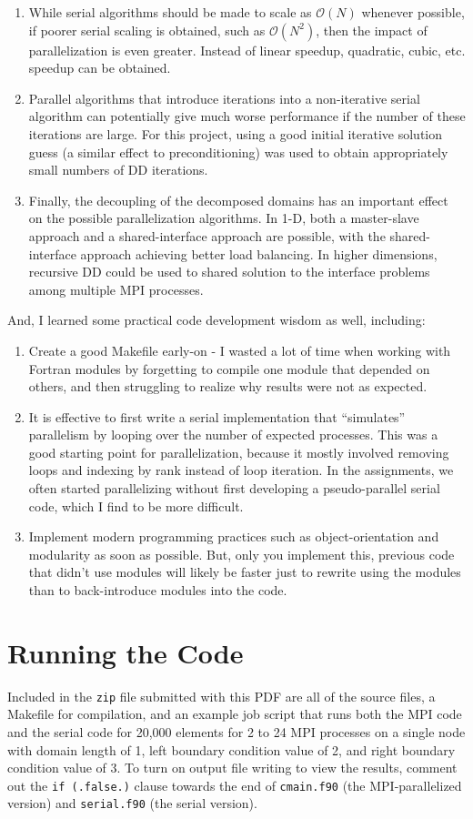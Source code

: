 \documentclass[10pt]{article}
\begin{document}
\begin{enumerate}
\item While serial algorithms should be made to scale as \(\mathscr{O}(N)\) whenever possible, if poorer serial scaling is obtained, such as \(\mathscr{O}(N^2)\), then the impact of parallelization is even greater. Instead of linear speedup, quadratic, cubic, etc. speedup can be obtained. 
\item Parallel algorithms that introduce iterations into a non-iterative serial algorithm can potentially give much worse performance if the number of these iterations are large. For this project, using a good initial iterative solution guess (a similar effect to preconditioning) was used to obtain appropriately small numbers of DD iterations.
\item Finally, the decoupling of the decomposed domains has an important effect on the possible parallelization algorithms. In 1-D, both a master-slave approach and a shared-interface approach are possible, with the shared-interface approach achieving better load balancing. In higher dimensions, recursive DD could be used to shared solution to the interface problems among multiple MPI processes.
\end{enumerate}

And, I learned some practical code development wisdom as well, including:

\begin{enumerate}
\item Create a good Makefile early-on - I wasted a lot of time when working with Fortran modules by forgetting to compile one module that depended on others, and then struggling to realize why results were not as expected.
\item It is effective to first write a serial implementation that ``simulates'' parallelism by looping over the number of expected processes. This was a good starting point for parallelization, because it mostly involved removing loops and indexing by rank instead of loop iteration. In the assignments, we often started parallelizing without first developing a pseudo-parallel serial code, which I find to be more difficult.
\item Implement modern programming practices such as object-orientation and modularity as soon as possible. But, only you implement this, previous code that didn't use modules will likely be faster just to rewrite using the modules than to back-introduce modules into the code.
\end{enumerate}

\section{Running the Code}
Included in the {\tt zip} file submitted with this PDF are all of the source files, a Makefile for compilation, and an example job script that runs both the MPI code and the serial code for 20,000 elements for 2 to 24 MPI processes on a single node with domain length of 1, left boundary condition value of 2, and right boundary condition value of 3. To turn on output file writing to view the results, comment out the {\tt if (.false.)} clause towards the end of {\tt cmain.f90} (the MPI-parallelized version) and {\tt serial.f90} (the serial version). 
\end{document}
